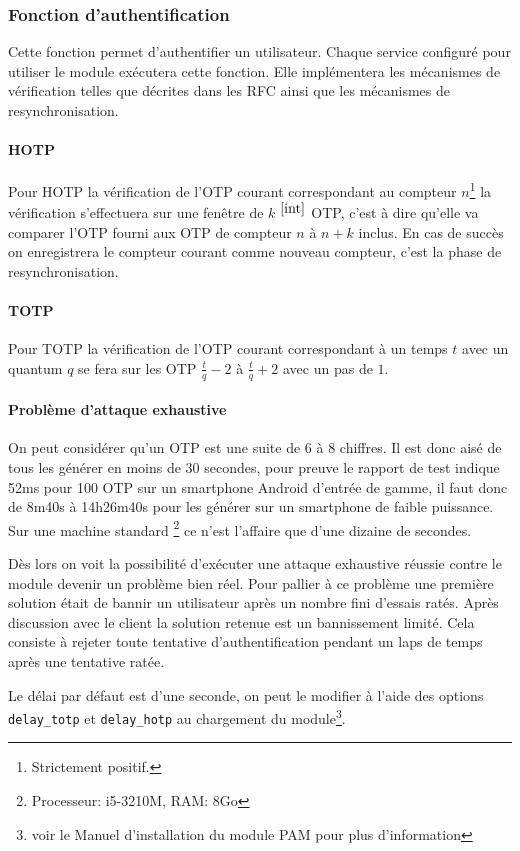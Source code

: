 \subsubsection{Fonction d'authentification}
Cette fonction permet d'authentifier un utilisateur. Chaque service configuré
pour utiliser le module exécutera cette fonction. Elle implémentera les
mécanismes de vérification telles que décrites dans les RFC ainsi que les
mécanismes de resynchronisation.
\paragraph{HOTP}
Pour HOTP la vérification de l'OTP courant correspondant au compteur
$n$\footnote{Strictement positif.\label{int}} la vérification s'effectuera sur
une fenêtre de  $k$ $^{\ref{int}}$ OTP, c'est à dire qu'elle va comparer l'OTP
fourni aux OTP de compteur $n$ à $n+k$ inclus. En cas de succès on enregistrera
le compteur courant comme nouveau compteur, c'est la phase de resynchronisation.
\paragraph{TOTP}
Pour TOTP la vérification de l'OTP courant correspondant à un temps $t$ avec un
quantum $q$ se fera sur les OTP $\frac{t}{q} - 2$ à $\frac{t}{q} + 2$ avec un
pas de $1$.
\paragraph{Problème d'attaque exhaustive}
On peut considérer qu'un OTP est une suite de 6 à 8 chiffres. Il est donc aisé
de tous les générer en moins de 30 secondes, pour preuve le rapport de test
indique 52ms pour 100 OTP sur un smartphone Android d'entrée de gamme,
il faut donc de 8m40s à 14h26m40s pour les générer sur un smartphone de faible
puissance. Sur une machine standard \footnote{Processeur: i5-3210M, RAM: 8Go} ce
n'est l'affaire que d'une dizaine de secondes.

Dès lors on voit la possibilité d'exécuter une attaque exhaustive réussie contre
le module devenir un problème bien réel. Pour pallier à ce problème une première
solution était de bannir un utilisateur après un nombre fini d'essais ratés. Après
discussion avec le client la solution retenue est un bannissement limité. Cela
consiste à rejeter toute tentative d'authentification pendant un laps de temps
après une tentative ratée.

Le délai par défaut est d'une seconde, on peut le modifier à l'aide des options
\verb?delay_totp? et \verb?delay_hotp? au chargement du module\footnote{voir le
Manuel d'installation du module PAM pour plus d'information}.

